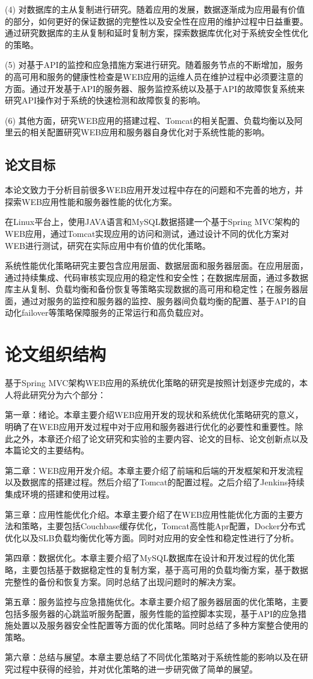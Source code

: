 (4) 对数据库的主从复制进行研究。随着应用的发展，数据逐渐成为应用最有价值的部分，如何更好的保证数据的完整性以及安全性在应用的维护过程中日益重要。通过研究数据库的主从复制和延时复制方案，探索数据库优化对于系统安全性优化的策略。

(5) 对基于API的监控和应急措施方案进行研究。随着服务节点的不断增加，服务的高可用和服务的健康性检查是WEB应用的运维人员在维护过程中必须要注意的方面。通过开发基于API的服务器、服务监控系统以及基于API的故障恢复系统来研究API操作对于系统的快速检测和故障恢复的影响。

(6) 其他方面，研究WEB应用的搭建过程、Tomcat的相关配置、负载均衡以及阿里云的相关配置研究WEB应用和服务器自身优化对于系统性能的影响。

\subsection{论文目标}
本论文致力于分析目前很多WEB应用开发过程中存在的问题和不完善的地方，并探索WEB应用性能和服务器性能的优化方案。

在Linux平台上，使用JAVA语言和MySQL数据搭建一个基于Spring MVC架构的WEB应用，通过Tomcat实现应用的访问和测试，通过设计不同的优化方案对WEB进行测试，研究在实际应用中有价值的优化策略。

系统性能优化策略研究主要包含应用层面、数据层面和服务器层面。在应用层面，通过持续集成、代码审核实现应用的稳定性和安全性；在数据库层面，通过多数据库主从复制、负载均衡和备份恢复等策略实现数据的高可用和稳定性；在服务器层面，通过对服务的监控和服务器的监控、服务器间负载均衡的配置、基于API的自动化failover等策略保障服务的正常运行和高负载应对。
\section{论文组织结构}
基于Spring MVC架构WEB应用的系统优化策略的研究是按照计划逐步完成的，本人将此研究分为六个部分：

第一章：绪论。本章主要介绍WEB应用开发的现状和系统优化策略研究的意义，明确了在WEB应用开发过程中对于应用和服务器进行优化的必要性和重要性。除此之外，本章还介绍了论文研究和实验的主要内容、论文的目标、论文创新点以及本篇论文的主要结构。

第二章：WEB应用开发介绍。本章主要介绍了前端和后端的开发框架和开发流程以及数据库的搭建过程。然后介绍了Tomcat的配置过程。之后介绍了Jenkins持续集成环境的搭建和使用过程。

第三章：应用性能优化介绍。本章主要介绍了在WEB应用性能优化方面的主要方法和策略，主要包括Couchbase缓存优化，Tomcat高性能Apr配置，Docker分布式优化以及SLB负载均衡优化等方面。同时对应用的安全性和稳定性进行了分析。

第四章：数据优化。本章主要介绍了MySQL数据库在设计和开发过程的优化策略，主要包括基于数据稳定性的复制方案，基于高可用的负载均衡方案，基于数据完整性的备份和恢复方案。同时总结了出现问题时的解决方案。

第五章：服务监控与应急措施优化。本章主要介绍了服务器层面的优化策略，主要包括多服务器的心跳监听服务配置，服务性能的监控脚本实现，基于API的应急措施处置以及服务器安全性配置等方面的优化策略。同时总结了多种方案整合使用的策略。

第六章：总结与展望。本章主要总结了不同优化策略对于系统性能的影响以及在研究过程中获得的经验，并对优化策略的进一步研究做了简单的展望。